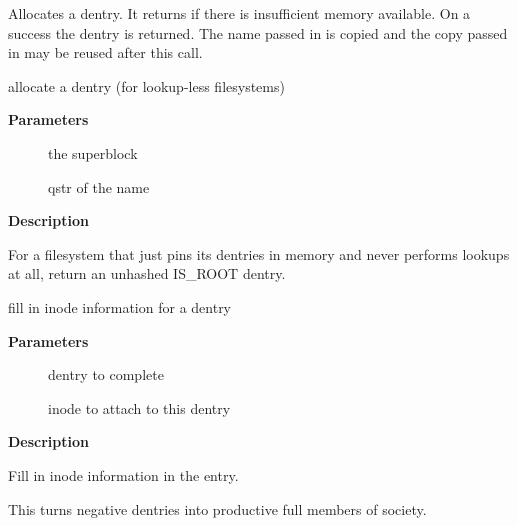 \documentclass[a4paper,8pt,english]{sphinxmanual}
\begin{document}
Allocates a dentry. It returns  if there is insufficient memory
available. On a success the dentry is returned. The name passed in is
copied and the copy passed in may be reused after this call.

\begin{fulllineitems}
\label{filesystems/index:c.d_alloc_pseudo}
allocate a dentry (for lookup-less filesystems)

\end{fulllineitems}


\textbf{Parameters}
\begin{description}
\item[{}] \leavevmode
the superblock

\item[{}] \leavevmode
qstr of the name

\end{description}

\textbf{Description}

For a filesystem that just pins its dentries in memory and never
performs lookups at all, return an unhashed IS\_ROOT dentry.

\begin{fulllineitems}
\label{filesystems/index:c.d_instantiate}
fill in inode information for a dentry

\end{fulllineitems}


\textbf{Parameters}
\begin{description}
\item[{}] \leavevmode
dentry to complete

\item[{}] \leavevmode
inode to attach to this dentry

\end{description}

\textbf{Description}

Fill in inode information in the entry.

This turns negative dentries into productive full members
of society.
\end{document}
